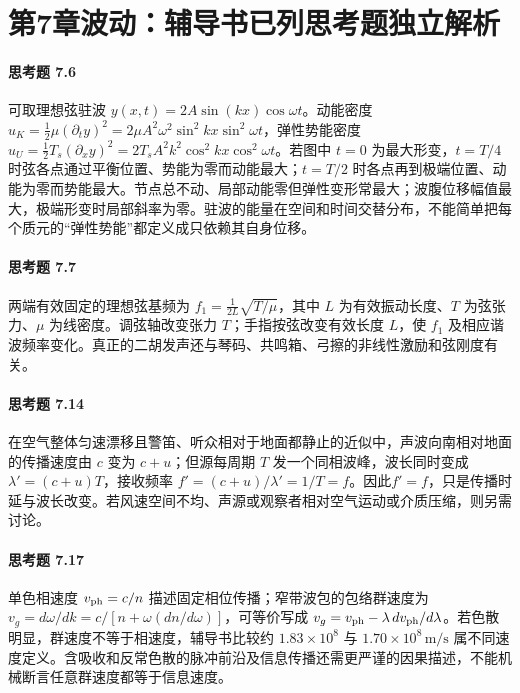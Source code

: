 \section*{第7章\quad 波动：辅导书已列思考题独立解析}
\paragraph{思考题 7.6}
可取理想弦驻波 \(y(x,t)=2A\sin(kx)\cos\omega t\)。动能密度 \(u_K=\frac12\mu(\partial_ty)^2=2\mu A^2\omega^2\sin^2kx\sin^2\omega t\)，弹性势能密度 \(u_U=\frac12T_s(\partial_xy)^2=2T_sA^2k^2\cos^2kx\cos^2\omega t\)。若图中 \(t=0\) 为最大形变，\(t=T/4\) 时弦各点通过平衡位置、势能为零而动能最大；\(t=T/2\) 时各点再到极端位置、动能为零而势能最大。节点总不动、局部动能零但弹性变形常最大；波腹位移幅值最大，极端形变时局部斜率为零。驻波的能量在空间和时间交替分布，不能简单把每个质元的“弹性势能”都定义成只依赖其自身位移。

\paragraph{思考题 7.7}
两端有效固定的理想弦基频为 \(\boxed{f_1=\frac{1}{2L}\sqrt{T/\mu}}\)，其中 \(L\) 为有效振动长度、\(T\) 为弦张力、\(\mu\) 为线密度。调弦轴改变张力 \(T\)；手指按弦改变有效长度 \(L\)，使 \(f_1\) 及相应谐波频率变化。真正的二胡发声还与琴码、共鸣箱、弓擦的非线性激励和弦刚度有关。

\paragraph{思考题 7.14}
在空气整体匀速漂移且警笛、听众相对于地面都静止的近似中，声波向南相对地面的传播速度由 \(c\) 变为 \(c+u\)；但源每周期 \(T\) 发一个同相波峰，波长同时变成 \(\lambda'=(c+u)T\)，接收频率 \(f'=(c+u)/\lambda'=1/T=f\)。因此\(\boxed{f'=f}\)，只是传播时延与波长改变。若风速空间不均、声源或观察者相对空气运动或介质压缩，则另需讨论。

\paragraph{思考题 7.17}
单色相速度 \(v_{\rm ph}=c/n\) 描述固定相位传播；窄带波包的包络群速度为 \(\boxed{v_g=d\omega/dk=c/[n+\omega(dn/d\omega)]}\)，可等价写成 \(v_g=v_{\rm ph}-\lambda\,dv_{\rm ph}/d\lambda\)。若色散明显，群速度不等于相速度，辅导书比较约 \(1.83\times10^8\) 与 \(1.70\times10^8\,\mathrm{m/s}\) 属不同速度定义。含吸收和反常色散的脉冲前沿及信息传播还需更严谨的因果描述，不能机械断言任意群速度都等于信息速度。
